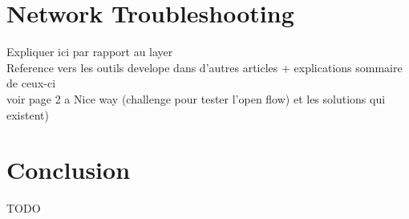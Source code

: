 \documentclass[10pt,article]{IEEEtran}
\begin{document}
\section{Network Troubleshooting}
Expliquer ici par rapport au layer\\
Reference vers les outils develope dans d'autres articles + explications sommaire de ceux-ci \\
voir page 2 a Nice way (challenge pour tester l'open flow) et les solutions qui existent)

\section{}

\section{Conclusion}
TODO
\nocite{*}


\end{document}
